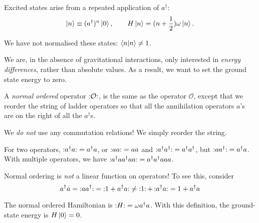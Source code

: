 Excited states arise from a repeated application of $a^\dagger$:
 \begin{equation}
   \ket{n} \equiv (a^\dagger)^n \ket{0}, \qquad H \ket{n} = (n + \frac{1}{2}) \omega \ket{n}.
\end{equation}
\begin{leftbar}
  \begin{remark}
    We have not normalised these states: $\bra{n} \ket{n} \neq 1$.
  \end{remark}
\end{leftbar}
\begin{leftbar}
  \begin{remark}
    We are, in the absence of gravitational interactions, only interested in \emph{energy differences}, rather than absolute values. As a result, we want to set the ground state energy to zero.
  \end{remark}
\end{leftbar}

\begin{definition}
  A \emph{normal ordered} operator $\mathop{:}\nolimits\!\mathcal{O}\!\mathop{:}\nolimits$, is the same as the operator $\mathcal{O}$, except that we reorder the string of ladder operators so that all the annihilation operators $a$'s are on the right of all the $a^\dagger$s.
\end{definition}
\begin{leftbar}
  \begin{remark}
    We \emph{do not} use any commutation relations! We simply reorder the string.
  \end{remark}
\end{leftbar}
\begin{example}[]
  For two operators, $\mathop{:}\nolimits\!a^{\dagger} a\!\mathop{:}\nolimits = a^{\dagger} a$, or $\mathop{:}\nolimits\!a a\!\mathop{:}\nolimits = aa$ and $\mathop{:}\nolimits\!a^{\dagger} a^{\dagger}\!\mathop{:}\nolimits = a^{\dagger} a^{\dagger}$, but $\mathop{:}\nolimits\!a a^{\dagger}\!\mathop{:}\nolimits = a^{\dagger} a$. With multiple operators, we have $\mathop{:}\nolimits\!a^{\dagger} a a^{\dagger} a a\!\mathop{:}\nolimits = a^{\dagger} a^{\dagger} a a a$.
\end{example}
\begin{leftbar}
  \begin{remark}
    Normal ordering is \emph{not} a linear function on operators! 
    To see this, consider
    \begin{equation}
      a^{\dagger} a = \normalorder{a a^{\dagger}} = \normalorder{1 + a^{\dagger} a} \neq \normalorder{1} + \normalorder{a^{\dagger} a} = 1 + a^{\dagger} a
    \end{equation}
  \end{remark}
\end{leftbar}

The normal ordered Hamiltonian is $\mathop{:}\nolimits\!H\!\mathop{:}\nolimits = \omega a^\dagger a$. With this definition, the ground-state energy is $H \ket{0} = 0$.

